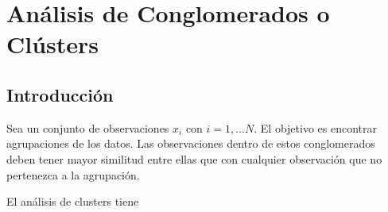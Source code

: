 \chapter{Análisis de Conglomerados o Clústers}
\section{Introducción}

Sea un conjunto de observaciones $x_i$ con $i=1,\ldots N$. El objetivo es encontrar agrupaciones de los datos. Las observaciones dentro de estos conglomerados deben tener mayor similitud entre ellas que con cualquier observación que no pertenezca a la agrupación. 

El análisis de clusters tiene 

